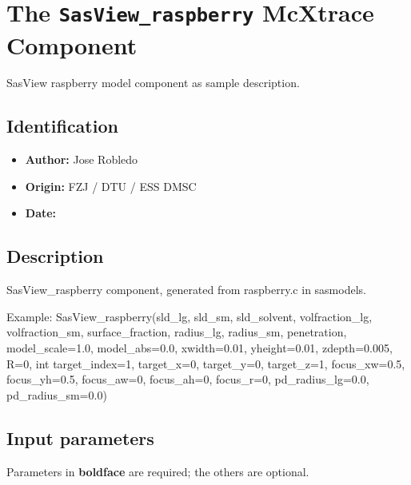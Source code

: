 \section{The \texttt{SasView\_raspberry} McXtrace Component}
SasView raspberry model component as sample description.

\subsection*{Identification}
\begin{itemize}
  \item \textbf{Author:} Jose Robledo
  \item \textbf{Origin:} FZJ / DTU / ESS DMSC
  \item \textbf{Date:} 
\end{itemize}

\subsection*{Description}
SasView\_raspberry component, generated from raspberry.c in sasmodels.

Example: SasView\_raspberry(sld\_lg, sld\_sm, sld\_solvent, volfraction\_lg, volfraction\_sm, surface\_fraction, radius\_lg, radius\_sm, penetration, model\_scale=1.0, model\_abs=0.0, xwidth=0.01, yheight=0.01, zdepth=0.005, R=0, int target\_index=1, target\_x=0, target\_y=0, target\_z=1, focus\_xw=0.5, focus\_yh=0.5, focus\_aw=0, focus\_ah=0, focus\_r=0, pd\_radius\_lg=0.0, pd\_radius\_sm=0.0)

\subsection*{Input parameters}
Parameters in \textbf{boldface} are required; the others are optional.

